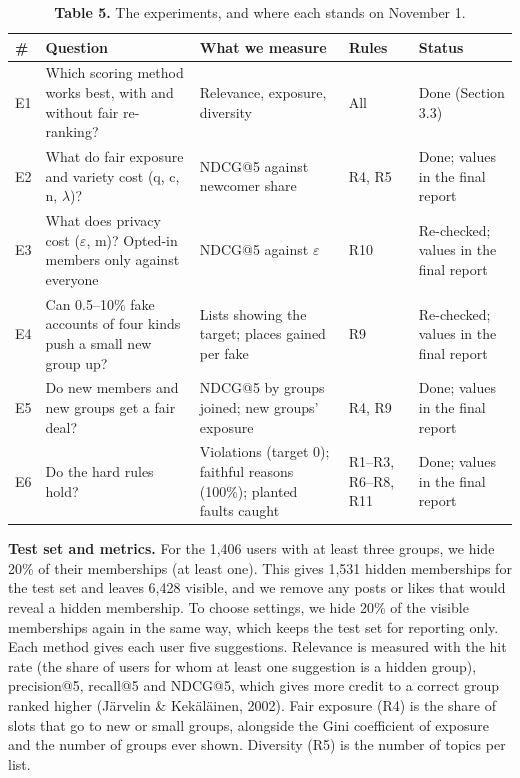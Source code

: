 \documentclass[11pt,letterpaper]{article}
\newcommand{\rowrule}{\midrule[0.2pt]}
\begin{document}
\begin{table}[!htbp]
\centering
\caption*{\textbf{Table 5.} The experiments, and where each stands on November 1.}
\scriptsize
\begin{tabular}{
  >{\raggedright\arraybackslash}p{}
  >{\raggedright\arraybackslash}p{}
  >{\raggedright\arraybackslash}p{}
  >{\raggedright\arraybackslash}p{}
  >{\raggedright\arraybackslash}p{}
}
\toprule
\textbf{\#} & \textbf{Question} & \textbf{What we measure} & \textbf{Rules} & \textbf{Status} \\
\midrule
E1 & Which scoring method works best, with and without fair re-ranking? & Relevance, exposure, diversity & All & Done (Section 3.3) \\
\rowrule
E2 & What do fair exposure and variety cost (q, c, n, $\lambda$)? & NDCG@5 against newcomer share & R4, R5 & Done; values in the final report \\
\rowrule
E3 & What does privacy cost ($\varepsilon$, m)? Opted-in members only against everyone & NDCG@5 against $\varepsilon$ & R10 & Re-checked; values in the final report \\
\rowrule
E4 & Can 0.5--10\% fake accounts of four kinds push a small new group up? & Lists showing the target; places gained per fake & R9 & Re-checked; values in the final report \\
\rowrule
E5 & Do new members and new groups get a fair deal? & NDCG@5 by groups joined; new groups' exposure & R4, R9 & Done; values in the final report \\
\rowrule
E6 & Do the hard rules hold? & Violations (target 0); faithful reasons (100\%); planted faults caught & R1--R3, R6--R8, R11 & Done; values in the final report \\
\bottomrule
\end{tabular}
\end{table}

\textbf{Test set and metrics.} For the 1,406 users with at least three groups, we hide 20\% of their
memberships (at least one). This gives 1,531 hidden memberships for the test set and leaves 6,428 visible, and
we remove any posts or likes that would reveal a hidden membership. To choose settings, we hide 20\% of the
visible memberships again in the same way, which keeps the test set for reporting only. Each method gives each
user five suggestions. Relevance is measured with the hit rate (the share of users for whom at least one
suggestion is a hidden group), precision@5, recall@5 and NDCG@5, which gives more credit to a correct group
ranked higher (Järvelin \& Kekäläinen, 2002). Fair exposure (R4) is the share of slots that go to new or small
groups, alongside the Gini coefficient of exposure and the number of groups ever shown. Diversity (R5) is the
number of topics per list.
\end{document}
